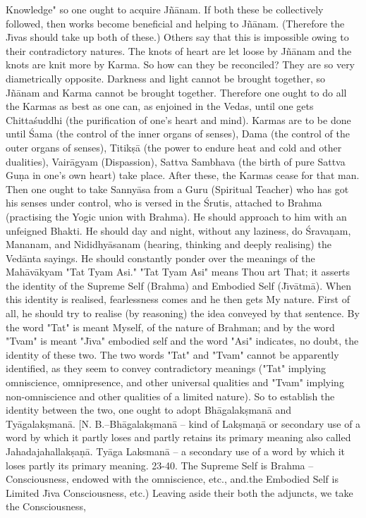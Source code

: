 Knowledge" so one ought to acquire J\~n\=anam. If both these be collectively followed, then works become beneficial and helping to J\~n\=anam. (Therefore the J\={\i}vas should take up both of these.) Others say that this is impossible owing to their contradictory natures. The knots of heart are let loose by J\~n\=anam and the knots are knit more by Karma. So how can they be reconciled? They are so very diametrically opposite. Darkness and light cannot be brought together, so J\~n\=anam and Karma cannot be brought together. Therefore one ought to do all the Karmas as best as one can, as enjoined in the Vedas, until one gets Chitta\'suddhi (the purification of one's heart and mind). Karmas are to be done until \'Sama (the control of the inner organs of senses), Dama (the control of the outer organs of senses), Titik\d{s}\=a (the power to endure heat and cold and other dualities), Vair\=agyam (Dispassion), Sattva Sambhava (the birth of pure Sattva Gu\d{n}a in one's own heart) take place. After these, the Karmas cease for that man. Then one ought to take Sanny\=asa from a Guru (Spiritual Teacher) who has got his senses under control, who is versed in the \'Srutis, attached to Brahma (practising the Yogic union with Brahma). He should approach to him with an unfeigned Bhakti. He should day and night, without any laziness, do \'Srava\d{n}am, Mananam, and Nididhy\=asanam (hearing, thinking and deeply realising) the Ved\=anta sayings. He should constantly ponder over the meanings of the Mah\=av\=akyam "Tat Tyam Asi." "Tat Tyam Asi" means Thou art That; it asserts the identity of the Supreme Self (Brahma) and Embodied Self (J\={\i}v\=atm\=a). When this identity is realised, fearlessness comes and he then gets My nature. First of all, he should try to realise (by reasoning) the idea conveyed by that sentence. By the word "Tat" is meant Myself, of the nature of Brahman; and by the word "Tvam" is meant "J\={\i}va" embodied self and the word "Asi" indicates, no doubt, the identity of these two. The two words "Tat" and "Tvam" cannot be apparently identified, as they seem to convey contradictory meanings ("Tat" implying omniscience, omnipresence, and other universal qualities and "Tvam" implying non-omniscience and other qualities of a limited nature). So to establish the identity between the two, one ought to adopt Bh\=agalak\d{s}man\=a and Ty\=agalak\d{s}man\=a. [N. B.--Bh\=agalak\d{s}man\=a -- kind of Lak\d{s}ma\d{n}\=a or secondary use of a word by which it partly loses and partly retains its primary meaning also called Jahadajahallak\d{s}a\d{n}\=a. Ty\=aga Laksman\=a -- a secondary use of a word by which it loses partly its primary meaning.
23-40. The Supreme Self is Brahma -- Consciousness, endowed with the omniscience, etc., and.the Embodied Self is Limited J\={\i}va Consciousness, etc.) Leaving aside their both the adjuncts, we take the Consciousness,

